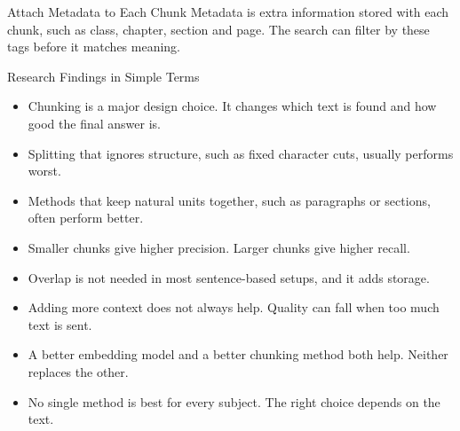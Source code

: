 \documentclass[aspectratio=169,10pt]{beamer}
\begin{document}
\begin{frame}[t]{Attach Metadata to Each Chunk}
\small
Metadata is extra information stored with each chunk, such as class, chapter, section and page. The search can filter by these tags before it matches meaning.
\vspace{14pt}
\begin{center}
\end{center}
\end{frame}

\begin{frame}[t]{Research Findings in Simple Terms}
\small
\begin{itemize}
  \item Chunking is a major design choice. It changes which text is found and how good the final answer is.
  \item Splitting that ignores structure, such as fixed character cuts, usually performs worst.
  \item Methods that keep natural units together, such as paragraphs or sections, often perform better.
  \item Smaller chunks give higher precision. Larger chunks give higher recall.
  \item Overlap is not needed in most sentence-based setups, and it adds storage.
  \item Adding more context does not always help. Quality can fall when too much text is sent.
  \item A better embedding model and a better chunking method both help. Neither replaces the other.
  \item No single method is best for every subject. The right choice depends on the text.
\end{itemize}
\end{frame}
\end{document}
